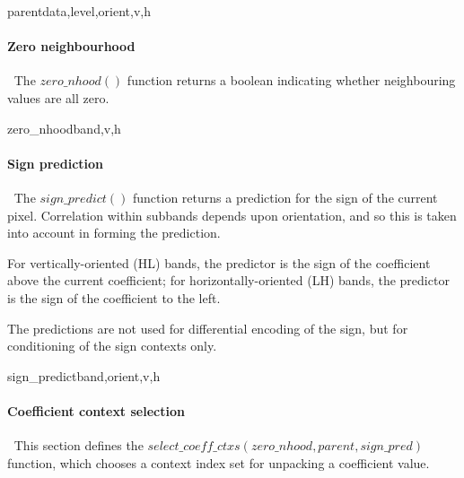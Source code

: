 \begin{pseudo}{parent}{data,level,orient,v,h}
\bsELSE
\bsEND
{}
\end{pseudo}

\paragraph{Zero neighbourhood}
\label{zeronhood}
$\ $\newline
The $zero\_nhood()$ function returns a boolean indicating whether neighbouring
values are all zero.

\begin{pseudo}{zero\_nhood}{band,v,h}
    \bsRET{\false}
  \bsEND
      \bsRET{\false}
    \bsEND
  \bsEND
\bsELSE
      \bsRET{\false}
    \bsEND
  \bsEND
\bsEND
\bsRET{\true}
\end{pseudo}

\paragraph{Sign prediction}
\label{signpredict}
$\ $\newline
The $sign\_predict()$ function returns a prediction for the sign of the 
current pixel. Correlation within subbands depends upon orientation,
and so this is taken into account in forming the prediction.

For vertically-oriented (HL) bands, the predictor is the sign of the
coefficient above the current coefficient; for horizontally-oriented (LH)
bands, the predictor is the sign of the coefficient to the left. 

The predictions are not used for differential encoding of the sign, but for
conditioning of the sign contexts only.

\begin{pseudo}{sign\_predict}{band,orient,v,h}
  \bsELSE
  \bsEND
{}
  \bsELSE
  \bsEND
\bsELSE
\bsEND{}
\end{pseudo}

\paragraph{Coefficient context selection}
\label{selectcoeffcontext}
$\ $\newline
This section defines the $select\_coeff\_ctxs(zero\_nhood, parent, sign\_pred)$
function, which chooses a context index set for unpacking a coefficient value.

